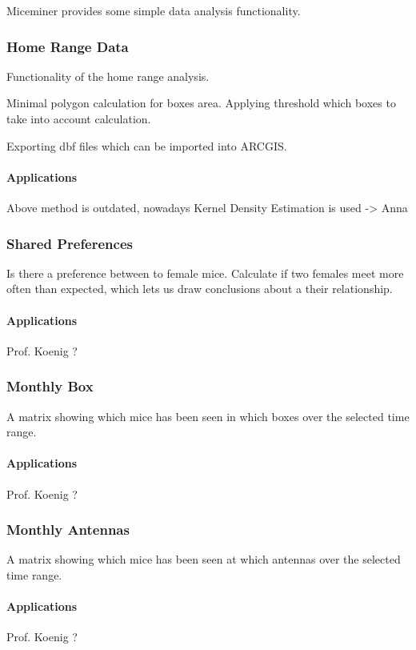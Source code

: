 Miceminer provides some simple data analysis functionality.

\subsubsection{Home Range Data}
\label{subsubsec:homerangedata} 

Functionality of the home range analysis.

Minimal polygon calculation for boxes area.
Applying threshold which boxes to take into account calculation. 

Exporting dbf files which can be imported into ARCGIS.

\paragraph{Applications}
Above method is outdated, nowadays Kernel Density Estimation is used -> Anna

\subsubsection{Shared Preferences}
\label{subsubsec:sharedpref} 

Is there a preference between to female mice.
Calculate if two females meet more often than expected, which lets us draw conclusions about a their relationship.

\paragraph{Applications}
Prof. Koenig ?

\subsubsection{Monthly Box}
\label{subsubsec:monthbox}

A matrix  showing which mice has been seen in which boxes over the selected time range.

\paragraph{Applications}
Prof. Koenig ?

\subsubsection{Monthly Antennas}
\label{subsubsec:monthant}

A matrix  showing which mice has been seen at which antennas over the selected time range.

\paragraph{Applications}
Prof. Koenig ?
